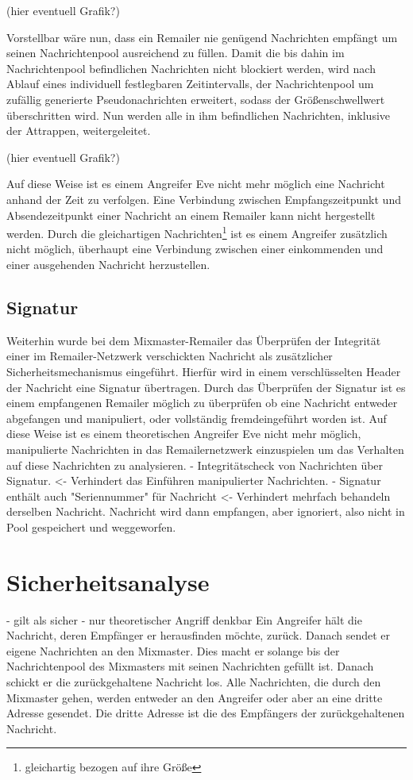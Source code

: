 (hier eventuell Grafik?)

Vorstellbar wäre nun, dass ein Remailer nie genügend Nachrichten empfängt um seinen Nachrichtenpool ausreichend zu füllen. Damit die bis dahin im Nachrichtenpool befindlichen Nachrichten nicht blockiert werden, wird nach Ablauf eines individuell festlegbaren Zeitintervalls, der Nachrichtenpool um zufällig generierte Pseudonachrichten erweitert, sodass der Größenschwellwert überschritten wird. Nun werden alle in ihm befindlichen Nachrichten, inklusive der Attrappen, weitergeleitet. 

(hier eventuell Grafik?)

Auf diese Weise ist es einem Angreifer Eve nicht mehr möglich eine Nachricht anhand der Zeit zu verfolgen. Eine Verbindung zwischen Empfangszeitpunkt und Absendezeitpunkt einer Nachricht an einem Remailer kann nicht hergestellt werden. Durch die gleichartigen Nachrichten\footnote{gleichartig bezogen auf ihre Größe} ist es einem Angreifer zusätzlich nicht möglich, überhaupt eine Verbindung zwischen einer einkommenden und einer ausgehenden Nachricht herzustellen. 


\subsection{Signatur}
Weiterhin wurde bei dem Mixmaster-Remailer das Überprüfen der Integrität einer im Remailer-Netzwerk verschickten Nachricht als zusätzlicher Sicherheitsmechanismus eingeführt. Hierfür wird in einem verschlüsselten Header der Nachricht eine Signatur übertragen. Durch das Überprüfen der Signatur ist es einem empfangenen Remailer möglich zu überprüfen ob eine Nachricht entweder abgefangen und manipuliert, oder vollständig fremdeingeführt worden ist. Auf diese Weise ist es einem theoretischen Angreifer Eve nicht mehr möglich, manipulierte Nachrichten in das Remailernetzwerk einzuspielen um das Verhalten auf diese Nachrichten zu analysieren.
- Integritätscheck von Nachrichten über Signatur. <- Verhindert das Einführen manipulierter Nachrichten.
- Signatur enthält auch "Seriennummer" für Nachricht <- Verhindert mehrfach behandeln derselben Nachricht. Nachricht wird dann empfangen, aber ignoriert, also nicht in Pool gespeichert und weggeworfen.

\section{Sicherheitsanalyse}
- gilt als sicher
- nur theoretischer Angriff denkbar
Ein Angreifer hält die Nachricht, deren Empfänger er herausfinden möchte, zurück. Danach sendet er eigene Nachrichten an den Mixmaster. Dies macht er solange bis der Nachrichtenpool des Mixmasters mit seinen Nachrichten gefüllt ist. Danach schickt er die zurückgehaltene Nachricht los. Alle Nachrichten, die durch den Mixmaster gehen, werden entweder an den Angreifer oder aber an eine dritte Adresse gesendet. Die dritte Adresse ist die des Empfängers der zurückgehaltenen Nachricht.
